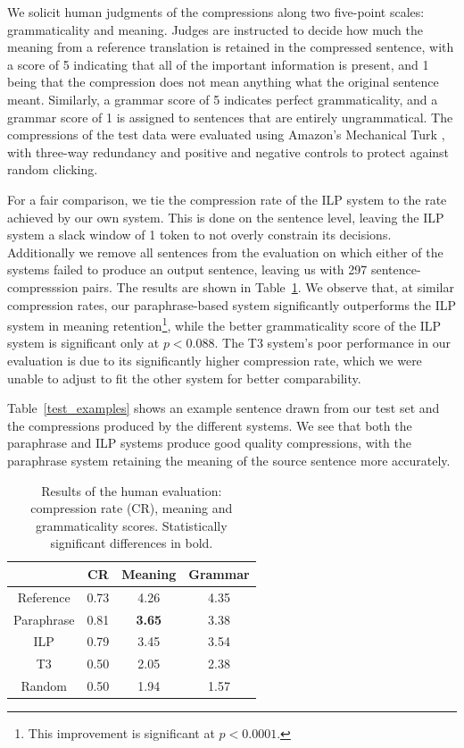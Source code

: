 \documentclass[11pt]{article}
\begin{document}
We solicit human judgments of the compressions along two five-point
scales: grammaticality and meaning. Judges are instructed to decide
how much the meaning from a reference translation is retained in the
compressed sentence, with a score of 5 indicating that all of the
important information is present, and 1 being that the compression
does not mean anything what the original sentence meant. Similarly, a
grammar score of 5 indicates perfect grammaticality, and a grammar
score of 1 is assigned to sentences that are entirely
ungrammatical. The compressions of the test data were evaluated using
Amazon's Mechanical Turk \cite{callisonburch-dredze:2010:MTURK}, with
three-way redundancy and positive and negative controls to protect
against random clicking.

For a fair comparison, we tie the compression rate of the ILP system
to the rate achieved by our own system. This is done on the sentence
level, leaving the ILP system a slack window of 1 token to not overly
constrain its decisions. Additionally we remove all sentences from the
evaluation on which either of the systems failed to produce an output
sentence, leaving us with 297 sentence-compresssion pairs. The results
are shown in Table~\ref{human_judgments}. We observe that, at similar
compression rates, our paraphrase-based system significantly
outperforms the ILP system in meaning retention\footnote{This
  improvement is significant at $p < 0.0001$.}, while the better
grammaticality score of the ILP system is significant only at $p <
0.088$. The T3 system's poor performance in our evaluation is due to
its significantly higher compression rate, which we were unable to
adjust to fit the other system for better comparability.

Table~\ref{test_examples} shows an example sentence drawn from our
test set and the compressions produced by the different systems. We
see that both the paraphrase and ILP systems produce good quality
compressions, with the paraphrase system retaining the meaning of the
source sentence more accurately.

\begin{table}
\begin{center}
\begin{tabular}{|c|c|c|c|}
  \hline
  & CR & Meaning & Grammar \\
  \hline
  Reference & 0.73 &  4.26 & 4.35 \\
  Paraphrase & 0.81 & {\bf 3.65} & 3.38 \\
  ILP & 0.79 & 3.45 & 3.54 \\
  T3 & 0.50 & 2.05 & 2.38 \\
  Random & 0.50 & 1.94 & 1.57 \\
  \hline
\end{tabular}
\end{center}
\caption{Results of the human evaluation: compression rate (CR),
  meaning and grammaticality scores. Statistically significant
  differences in bold.}
\label{human_judgments}
\end{table}
\end{document}
